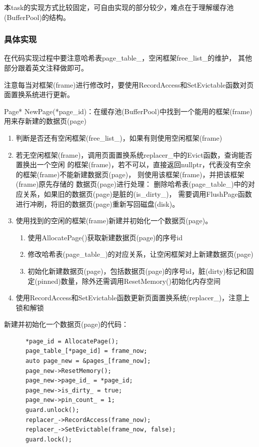 \documentclass[a4paper]{article}
\begin{document}
本task的实现方式比较固定，可自由实现的部分较少，难点在于理解缓存池(BufferPool)的结构。

\subsubsection{具体实现}

在代码实现过程中要注意哈希表page\_table\_，空闲框架free\_list\_的维护，
其他部分跟着英文注释做即可。

注意每当对框架(frame)进行修改时，要使用RecordAccess和SetEvictable函数对页面置换系统进行更新。

Page* NewPage(*page\_id)：在缓存池(BufferPool)中找到一个能用的框架(frame)
用来存新建的数据页(page)
\begin{enumerate}
   \item 判断是否还有空闲框架(free\_list\_)，如果有则使用空闲框架(frame)
   \item 若无空闲框架(frame)，调用页面置换系统replacer\_中的Evict函数，查询能否置换出一个空闲
   的框架(frame)，若不可以，直接返回nullptr，代表没有空余的框架(frame)不能新建数据页(page)，
   则使用该框架(frame)，并把该框架(frame)原先存储的 数据页(page)进行处理：
   删除哈希表(page\_table\_)中的对应关系，如果旧的数据页(page)是脏的(is\_dirty\_)，
   需要调用FlushPage函数进行冲刷，将旧的数据页(page)重新写回磁盘(disk)。
   \item 使用找到的空闲的框架(frame)新建并初始化一个数据页(page)。
   \begin{enumerate}
      \item 使用AllocatePage()获取新建数据页(page)的序号id
      \item 修改哈希表(page\_table\_)的对应关系，让空闲框架对上新建数据页(page)
      \item 初始化新建数据页(page)，包括数据页(page)的序号id，脏(dirty)标记和固定(pinned)数量，除外还需调用ResetMemory()初始化内存空间
   \end{enumerate}
   \item 使用RecordAccess和SetEvictable函数更新页面置换系统(replacer\_)，注意上锁和解锁
\end{enumerate}

新建并初始化一个数据页(page)的代码：
\begin{verbatim}
      *page_id = AllocatePage();
      page_table_[*page_id] = frame_now;
      auto page_new = &pages_[frame_now];
      page_new->ResetMemory();
      page_new->page_id_ = *page_id;
      page_new->is_dirty_ = true;
      page_new->pin_count_ = 1;
      guard.unlock();
      replacer_->RecordAccess(frame_now);
      replacer_->SetEvictable(frame_now, false);
      guard.lock();
\end{verbatim}
\end{document}
